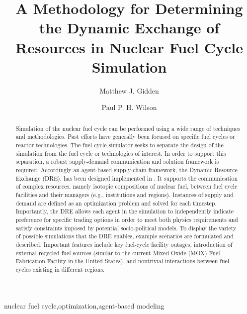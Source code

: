 

\begin{frontmatter}

\title{A Methodology for Determining the Dynamic Exchange of Resources in
  Nuclear Fuel Cycle Simulation}

\author[iiasa]{Matthew J. Gidden}
\address[iiasa]{International Institute for Applied Systems Analysis,
  Schlossplatz 1, A-2361 Laxenburg, Austria}
\author[uw]{Paul P. H. Wilson}
\address[uw]{University of Wisconsin - Madison, Department of Nuclear
  Engineering and Engineering Physics, Madison, WI 53706}

\begin{abstract}
Simulation of the nuclear fuel cycle can be performed using a wide range of
techniques and methodologies. Past efforts have generally been focused on
specific fuel cycles or reactor technologies. The \Cyclus fuel cycle simulator
seeks to separate the design of the simulation from the fuel cycle or
technologies of interest. In order to support this separation, a robust
supply-demand communication and solution framework is required. Accordingly
an agent-based supply-chain framework, the Dynamic Resource Exchange (DRE), has
been designed implemented in \Cyclus. It supports the communication of complex
resources, namely isotopic compositions of nuclear fuel, between fuel cycle
facilities and their managers (e.g., institutions and regions). Instances of
supply and demand are defined as an optimization problem and solved for each
timestep. Importantly, the DRE allows each agent in the simulation to independently
indicate preference for specific trading options in order to meet both physics 
requirements and satisfy constraints imposed by potential socio-political models.
To display the variety of possible simulations that the DRE enables,
example scenarios are formulated and described. Important features include key
fuel-cycle facility outages, introduction of external recycled fuel sources
(similar to the current Mixed Oxide (MOX) Fuel Fabrication Facility in the United States), and
nontrivial interactions between fuel cycles existing in different regions.
\end{abstract}

\begin{keyword}
nuclear fuel cycle\sep  optimization\sep agent-based modeling
\end{keyword}

\end{frontmatter}

\linenumbers
